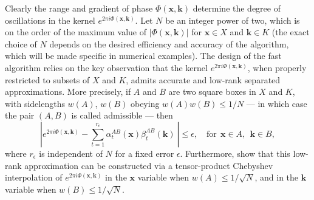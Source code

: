 Clearly the range and gradient of phase $\Phi(\mathbf{x},\mathbf{k})$ determine the degree of oscillations in the kernel $e^{ 2\pi i\Phi(\mathbf{x},\mathbf{k})}$. Let $N$ be an integer power of two, which is on the order of the maximum value of $|\Phi(\mathbf{x},\mathbf{k})|$ for $\mathbf{x}\in X$ and $\mathbf{k}\in K$ (the exact choice of $N$ depends on the desired efficiency and accuracy of the algorithm, which will be made specific in numerical examples). The design of the fast algorithm relies on the key observation that the kernel $e^{ 2\pi i\Phi(\mathbf{x},\mathbf{k})}$, when properly restricted to subsets of $X$ and $K$, admits accurate and low-rank separated approximations. More precisely, if $A$ and $B$ are two square boxes in $X$ and $K$, with sidelengths $w(A)$, $w(B)$ obeying $w(A)w(B)\leq1/N$ --- in which case the pair $(A,B)$ is called admissible --- then
\begin{equation} \label{low-rank}
\left|e^{2\pi i \Phi(\mathbf{x},\mathbf{k})} -\sum_{t=1}^{r_\epsilon} 
\alpha_t^{AB}(\mathbf{x})\beta_t^{AB}(\mathbf{k})\ \right|\leq
\epsilon, \quad \text{for} \  \  \mathbf{x}\in
A, \ \ \mathbf{k}\in B,
\end{equation}
where $r_{\epsilon}$ is independent of $N$ for a fixed error $\epsilon$.  Furthermore, \cite{CDY09} show that this low-rank approximation can be constructed via a tensor-product Chebyshev interpolation of $e^{2\pi i \Phi(\mathbf{x},\mathbf{k})}$ in the $\mathbf{x}$ variable when $w(A)\leq 1/\sqrt{N}$, and in the $\mathbf{k}$ variable when $w(B)\leq 1/\sqrt{N}$.  

